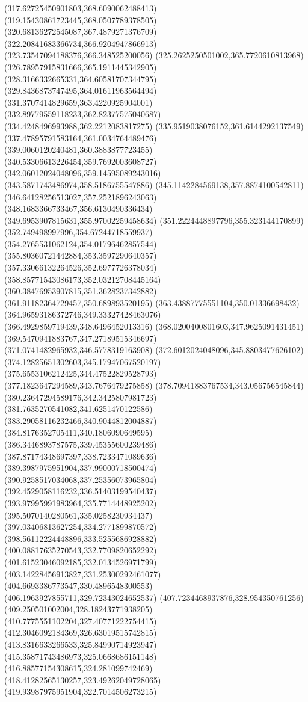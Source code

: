 {(317.62725450901803,368.6090062488413)
(319.15430861723445,368.0507789378505)
(320.68136272545087,367.4879271376709)
(322.20841683366734,366.9204947866913)
(323.73547094188376,366.348525200056)
(325.2625250501002,365.7720610813968)
(326.78957915831666,365.1911445342905)
(328.3166332665331,364.60581707344795)
(329.8436873747495,364.01611963564494)
(331.3707414829659,363.4220925904001)
(332.89779559118233,362.82377575040687)
(334.4248496993988,362.2212083817275)
(335.9519038076152,361.6144292137549)
(337.47895791583164,361.0034764489476)
(339.0060120240481,360.3883877723455)
(340.53306613226454,359.7692003608727)
(342.06012024048096,359.14595089243016)
(343.5871743486974,358.5186755547886)
(345.1142284569138,357.8874100542811)
(346.64128256513027,357.2521896243063)
(348.1683366733467,356.6130490336434)
(349.6953907815631,355.97002259458634)
(351.2224448897796,355.323144170899)
(352.749498997996,354.67244718559937)
(354.2765531062124,354.01796462857544)
(355.80360721442884,353.3597290640357)
(357.33066132264526,352.6977726378034)
(358.85771543086173,352.03212708445164)
(360.38476953907815,351.3628237342882)
(361.91182364729457,350.689893520195)
(363.43887775551104,350.01336698432)
(364.96593186372746,349.33327428463076)
(366.4929859719439,348.6496452013316)
(368.0200400801603,347.9625091431451)
(369.5470941883767,347.27189515346697)
(371.0741482965932,346.5778319163908)
(372.6012024048096,345.8803477626102)
(374.12825651302603,345.17947067520197)
(375.6553106212425,344.47522829528793)
(377.1823647294589,343.7676479275858)
(378.70941883767534,343.056756545844)
(380.23647294589176,342.3425807981723)
(381.7635270541082,341.6251470122586)
(383.29058116232466,340.9044812004887)
(384.8176352705411,340.1806090649595)
(386.3446893787575,339.45355600239486)
(387.87174348697397,338.7233471089636)
(389.3987975951904,337.99000718500474)
(390.9258517034068,337.25356073965804)
(392.4529058116232,336.51403199540437)
(393.97995991983964,335.7714448925202)
(395.5070140280561,335.0258230934437)
(397.03406813627254,334.2771899870572)
(398.56112224448896,333.5255686928882)
(400.08817635270543,332.7709820652292)
(401.61523046092185,332.0134526971799)
(403.14228456913827,331.25300292461077)
(404.6693386773547,330.4896548300553)
(406.1963927855711,329.72343024652537)
(407.7234468937876,328.954350761256)
(409.250501002004,328.18243771938205)
(410.7775551102204,327.40771222754415)
(412.3046092184369,326.63019515742815)
(413.8316633266533,325.84990714923947)
(415.35871743486973,325.0668686151148)
(416.88577154308615,324.281099742469)
(418.41282565130257,323.49262049728065)
(419.93987975951904,322.7014506273215)
}
